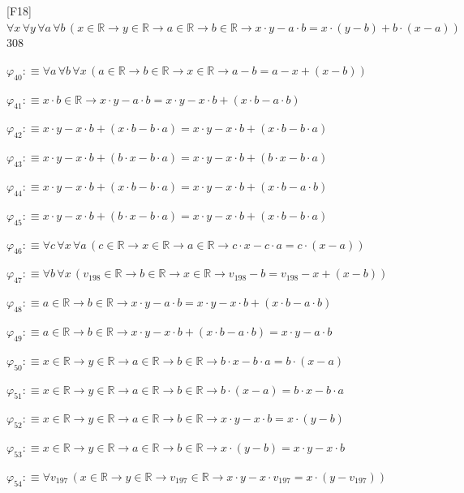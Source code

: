 \begin{fullproof}{[F18]}{$\forall x\,\forall y\,\forall a\,\forall b\,(x \in \mathbb{R} \to y \in \mathbb{R} \to a \in \mathbb{R} \to b \in \mathbb{R} \to x \cdot y - a \cdot b = x \cdot (y - b) + b \cdot (x - a))$}{308}
\begin{abbrevlist}
\item $\varphi_{40} :\equiv \forall a\,\forall b\,\forall x\,(a \in \mathbb{R} \to b \in \mathbb{R} \to x \in \mathbb{R} \to a - b = a - x + (x - b))$
\item $\varphi_{41} :\equiv x \cdot b \in \mathbb{R} \to x \cdot y - a \cdot b = x \cdot y - x \cdot b + (x \cdot b - a \cdot b)$
\item $\varphi_{42} :\equiv x \cdot y - x \cdot b + (x \cdot b - b \cdot a) = x \cdot y - x \cdot b + (x \cdot b - b \cdot a)$
\item $\varphi_{43} :\equiv x \cdot y - x \cdot b + (b \cdot x - b \cdot a) = x \cdot y - x \cdot b + (b \cdot x - b \cdot a)$
\item $\varphi_{44} :\equiv x \cdot y - x \cdot b + (x \cdot b - b \cdot a) = x \cdot y - x \cdot b + (x \cdot b - a \cdot b)$
\item $\varphi_{45} :\equiv x \cdot y - x \cdot b + (b \cdot x - b \cdot a) = x \cdot y - x \cdot b + (x \cdot b - b \cdot a)$
\item $\varphi_{46} :\equiv \forall c\,\forall x\,\forall a\,(c \in \mathbb{R} \to x \in \mathbb{R} \to a \in \mathbb{R} \to c \cdot x - c \cdot a = c \cdot (x - a))$
\item $\varphi_{47} :\equiv \forall b\,\forall x\,(v_{198} \in \mathbb{R} \to b \in \mathbb{R} \to x \in \mathbb{R} \to v_{198} - b = v_{198} - x + (x - b))$
\item $\varphi_{48} :\equiv a \in \mathbb{R} \to b \in \mathbb{R} \to x \cdot y - a \cdot b = x \cdot y - x \cdot b + (x \cdot b - a \cdot b)$
\item $\varphi_{49} :\equiv a \in \mathbb{R} \to b \in \mathbb{R} \to x \cdot y - x \cdot b + (x \cdot b - a \cdot b) = x \cdot y - a \cdot b$
\item $\varphi_{50} :\equiv x \in \mathbb{R} \to y \in \mathbb{R} \to a \in \mathbb{R} \to b \in \mathbb{R} \to b \cdot x - b \cdot a = b \cdot (x - a)$
\item $\varphi_{51} :\equiv x \in \mathbb{R} \to y \in \mathbb{R} \to a \in \mathbb{R} \to b \in \mathbb{R} \to b \cdot (x - a) = b \cdot x - b \cdot a$
\item $\varphi_{52} :\equiv x \in \mathbb{R} \to y \in \mathbb{R} \to a \in \mathbb{R} \to b \in \mathbb{R} \to x \cdot y - x \cdot b = x \cdot (y - b)$
\item $\varphi_{53} :\equiv x \in \mathbb{R} \to y \in \mathbb{R} \to a \in \mathbb{R} \to b \in \mathbb{R} \to x \cdot (y - b) = x \cdot y - x \cdot b$
\item $\varphi_{54} :\equiv \forall v_{197}\,(x \in \mathbb{R} \to y \in \mathbb{R} \to v_{197} \in \mathbb{R} \to x \cdot y - x \cdot v_{197} = x \cdot (y - v_{197}))$

\end{abbrevlist}
\end{fullproof}
